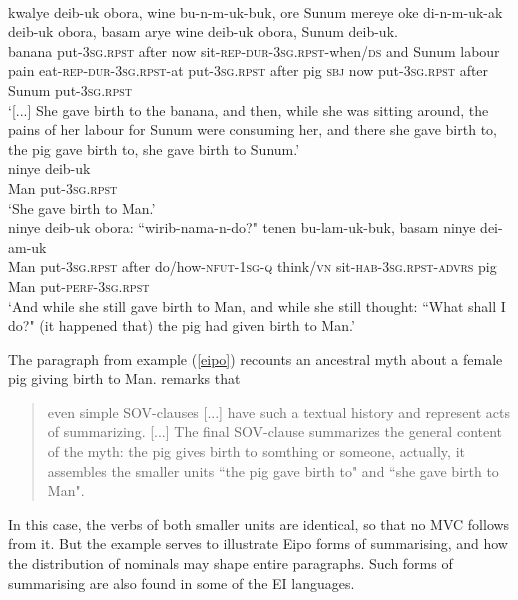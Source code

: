 \ea \label{eipo}
\\
\ea
\gll kwalye deib-uk obora, wine bu-n-m-uk-buk, ore Sunum mereye oke di-n-m-uk-ak deib-uk obora, basam arye wine deib-uk obora, Sunum deib-uk. \\
banana put-3\textsc{sg}.\textsc{rpst} after now sit-\textsc{rep}-\textsc{dur}-3\textsc{sg}.\textsc{rpst}-when/\textsc{ds} and Sunum labour pain eat-\textsc{rep}-\textsc{dur}-3\textsc{sg}.\textsc{rpst}-at put-3\textsc{sg}.\textsc{rpst} after pig \textsc{sbj} now put-3\textsc{sg}.\textsc{rpst} after Sunum put-3\textsc{sg}.\textsc{rpst} \\
\glft `[...] She gave birth to the banana, and then, while she was sitting around, the pains of her labour for Sunum were consuming her, and there she gave birth to, the pig gave birth to, she gave birth to Sunum.' \\ 
\ex
\gll ninye deib-uk \\
Man put-3\textsc{sg}.\textsc{rpst} \\
\glft `She gave birth to Man.' \\ 
\ex
\gll ninye deib-uk obora: ``wirib-nama-n-do?" tenen bu-lam-uk-buk, basam ninye dei-am-uk \\ 
Man put-3\textsc{sg}.\textsc{rpst} after do/how-\textsc{nfut}-1\textsc{sg}-\textsc{q} think/\textsc{vn} sit-\textsc{hab}-3\textsc{sg}.\textsc{rpst}-\textsc{advrs} pig Man put-\textsc{perf}-3\textsc{sg}.\textsc{rpst} \\
\glft `And while she still gave birth to Man, and while she still thought: ``What shall I do?" (it happened that) the pig had given birth to Man.'\\ 
\z
\z

The paragraph from example (\ref{eipo}) recounts an ancestral myth about a female pig giving birth to Man. \citet[308]{heeschen1998eipo} remarks that 

\begin{quote}even simple SOV-clauses [...] have such a textual history and represent acts of summarizing. [...] The final SOV-clause summarizes the general content of the myth: the pig gives birth to somthing or someone, actually, it assembles the smaller units ``the pig gave birth to" and ``she gave birth to Man".\end{quote} 

In this case, the verbs of both smaller units are identical, so that no MVC follows from it. But the example serves to illustrate Eipo forms of summarising, and how the distribution of nominals may shape entire paragraphs. Such forms of summarising are also found in some of the EI languages.


